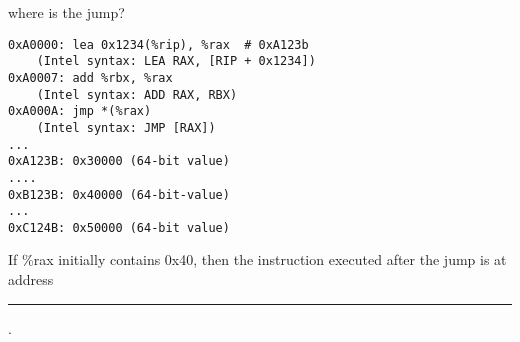 \begin{frame}[fragile,label=whereIsJumpEx]{where is the jump?}
\begin{Verbatim}[fontsize=\small]
0xA0000: lea 0x1234(%rip), %rax  # 0xA123b
    (Intel syntax: LEA RAX, [RIP + 0x1234])
0xA0007: add %rbx, %rax
    (Intel syntax: ADD RAX, RBX)
0xA000A: jmp *(%rax)
    (Intel syntax: JMP [RAX])
...
0xA123B: 0x30000 (64-bit value)
....
0xB123B: 0x40000 (64-bit-value)
...
0xC124B: 0x50000 (64-bit value)
\end{Verbatim}
If \%rax initially contains 0x40, then the instruction
executed after the jump is at address \rule{1cm}{1pt}.
\end{frame}
